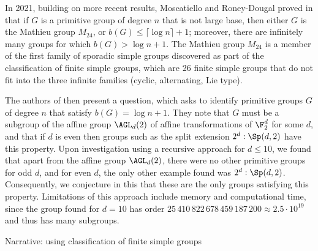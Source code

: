 In 2021, building on more recent results, Moscatiello and Roney-Dougal proved in \cite{moscatiello_roney-dougal2021} that if $G$ is a primitive group of degree $n$ that is not large base, then either $G$ is the Mathieu group $M_{24}$, or $b(G) \leq \lceil\log n\rceil + 1$; moreover, there are infinitely many groups for which $b(G) > \log n + 1$. The Mathieu group $M_{24}$ is a member of the first family of sporadic simple groups discovered as part of the classification of finite simple groups, which are 26 finite simple groups that do not fit into the three infinite families (cyclic, alternating, Lie type).

The authors of \cite{moscatiello_roney-dougal2021} then present a question, which asks to identify primitive groups $G$ of degree $n$ that satisfy $b(G) = \log n + 1$. They note that $G$ must be a subgroup of the affine group $\AGL_d(2)$ of affine transformations of $\F_2^d$ for some $d$, and that if $d$ is even then groups such as the split extension $2^d : \Sp(d,2)$ have this property. Upon investigation using a recursive approach for $d \leq 10$, we found that apart from the affine group $\AGL_d(2)$, there were no other primitive groups for odd $d$, and for even $d$, the only other example found was $2^d : \Sp(d,2)$. Consequently, we conjecture in this \thesis{} that these are the only groups satisfying this property. Limitations of this approach include memory and computational time, since the group found for $d = 10$ has order $25\,410\,822\,678\,459\,187\,200 \approx 2.5 \cdot 10^{19}$ and thus has many subgroups.

Narrative: using classification of finite simple groups


